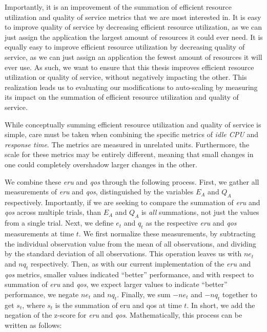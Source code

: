 Importantly, it is an improvement of the summation of efficient resource
utilization and quality of service metrics that we are most interested in. It is
easy to improve quality of service by decreasing efficient resource
utilization, as we can just assign the application the largest amount of
resources it could ever need. It is equally easy to improve efficient resource
utilization by decreasing quality of service, as we can just assign an
application the fewest amount of resources it will ever use. As such, we want to
ensure that this thesis improves efficient resource utilization or quality of
service, without negatively impacting the other. This realization leads us to
evaluating our modifications to auto-scaling by measuring its impact on the
summation of efficient resource utilization and quality of service.

While conceptually summing efficient resource utilization and quality of service
is simple, care must be taken when combining the specific metrics of
\textit{idle CPU} and \textit{response time}. The metrics are measured in unrelated
units. Furthermore, the scale for these metrics may be entirely different,
meaning that small changes in one could completely overshadow larger changes in
the other.

We combine these \textit{eru} and \textit{qos} through the following process.
First, we gather all measurements of \textit{eru} and \textit{qos},
distinguished by the variables $E_{A}$ and $Q_{A}$ respectively. Importantly,
if we are seeking to compare the summation of \textit{eru} and \textit{qos}
across multiple trials, than $E_{A}$ and $Q_{A}$ is \textit{all} summations, not
just the values from a single trial. Next, we define $e_{t}$ and $q_{t}$ as the
respective \textit{eru} and \textit{qos} measurements at time $t$. We first
normalize these measurements, by subtracting the individual observation value
from the mean of all observations, and dividing by the standard deviation of all
observations. This operation leaves us with $ne_{t}$ and $nq_{t}$ respectively.
Then, as with our current implementation of the \textit{eru} and \textit{qos}
metrics, smaller values indicated ``better'' performance, and with respect to
summation of \textit{eru} and \textit{qos}, we expect larger values to indicate
``better'' performance, we negate $ne_{t}$ and $nq_{t}$. Finally, we sum
$-ne_{t}$ and $-nq_{t}$ together to get $s_{t}$, where $s_{t}$ is the summation
of eru and qos at time $t$. In short, we add the negation of the z-score for
\textit{eru} and \textit{qos}. Mathematically, this process can be written as
follows:

